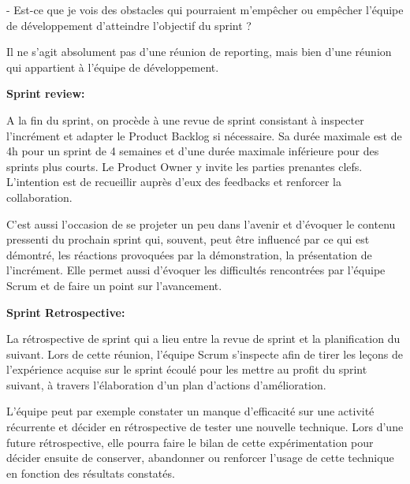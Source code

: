 \documentclass[a4paper, 12pt]{report}
\begin{document}
\begin{itemize}
- Est-ce que je vois des obstacles qui pourraient m'empêcher ou empêcher l'équipe de développement d'atteindre l'objectif du sprint ? 

Il ne s'agit absolument pas d'une réunion de reporting, mais bien d’une réunion qui appartient à l'équipe de développement. 

\textbf{Sprint review:} 

A la fin du sprint, on procède à une revue de sprint consistant à inspecter l’incrément et adapter le Product Backlog si nécessaire. Sa durée maximale est de 4h pour un sprint de 4 semaines et d’une durée maximale inférieure pour des sprints plus courts. Le Product Owner y invite les parties prenantes clefs. L’intention est de recueillir auprès d’eux des feedbacks et renforcer la collaboration.  

C'est aussi l'occasion de se projeter un peu dans l'avenir et d'évoquer le contenu pressenti du prochain sprint qui, souvent, peut être influencé par ce qui est démontré, les réactions provoquées par la démonstration, la présentation de l'incrément. Elle permet aussi d'évoquer les difficultés rencontrées par l’équipe Scrum et de faire un point sur l'avancement. 



\textbf{Sprint Retrospective:} 

La rétrospective de sprint qui a lieu entre la revue de sprint et la planification du suivant. Lors de cette réunion, l’équipe Scrum s’inspecte afin de tirer les leçons de l’expérience acquise sur le sprint écoulé pour les mettre au profit du sprint suivant, à travers l’élaboration d’un plan d’actions d’amélioration. 

L’équipe peut par exemple constater un manque d’efficacité sur une activité récurrente et décider en rétrospective de tester une nouvelle technique. Lors d’une future rétrospective, elle pourra faire le bilan de cette expérimentation pour décider ensuite de conserver, abandonner ou renforcer l’usage de cette technique en fonction des résultats constatés. 


\end{itemize}
\end{document}
